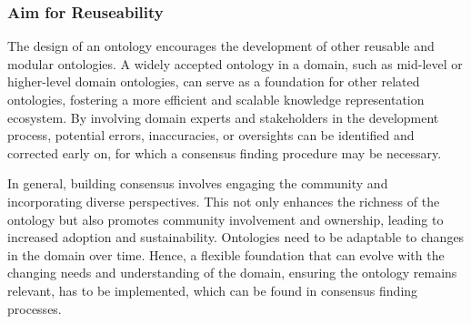 
\subsubsection{Aim for Reuseability}

The design of an ontology encourages the development of other reusable and modular ontologies. A widely accepted ontology in a domain, such as mid-level or higher-level domain ontologies, can serve as a foundation for other related ontologies, fostering a more efficient and scalable knowledge representation ecosystem. By involving domain experts and stakeholders in the development process, potential errors, inaccuracies, or oversights can be identified and corrected early on, for which a consensus finding procedure may be necessary.

In general, building consensus involves engaging the community and incorporating diverse perspectives. This not only enhances the richness of the ontology but also promotes community involvement and ownership, leading to increased adoption and sustainability.
Ontologies need to be adaptable to changes in the domain over time. Hence, a flexible foundation that can evolve with the changing needs and understanding of the domain, ensuring the ontology remains relevant, has to be implemented, which can be found in consensus finding processes.

